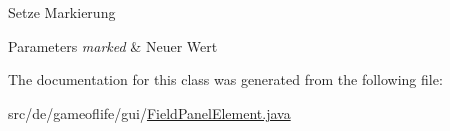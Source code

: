 Setze Markierung 
\begin{DoxyParams}{Parameters}
{\em marked} & Neuer Wert \\
\hline
\end{DoxyParams}


The documentation for this class was generated from the following file\-:\begin{DoxyCompactItemize}
\item 
src/de/gameoflife/gui/\hyperlink{FieldPanelElement_8java}{Field\-Panel\-Element.\-java}\end{DoxyCompactItemize}
